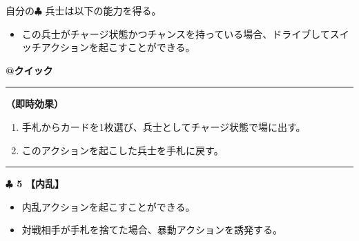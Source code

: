 \documentclass[twocolumn,a5paper,papersize,10pt]{jarticle}
\begin{document}
自分の{\normalsize $\clubsuit$} 兵士は以下の能力を得る。


\vspace{-1zh}%
\begin{itemize}
\setlength{\leftskip}{-0.3cm}
\setlength{\parskip}{0pt} %

\item この兵士がチャージ状態かつチャンスを持っている場合、ドライブしてスイッチアクションを起こすことができる。
\vspace{-1zh}%
\end{itemize}

\begin{tcolorbox}[title={\small\bf【Action】スイッチ}{\scriptsize （兵士起因）}]

{\scriptsize\bf @クイック }

\vspace{1mm} %
\hrule height 0.1mm depth 0mm width 62mm %
\vspace{1mm} %

{\bf（即時効果）}


\vspace{-1zh}%
\begin{enumerate}
\setlength{\leftskip}{-0.3cm}
\setlength{\parskip}{0pt} %

\item 手札からカードを1枚選び、兵士としてチャージ状態で場に出す。

\item このアクションを起こした兵士を手札に戻す。
\vspace{-1zh}%
\end{enumerate}

\vspace{1mm} %
\end{tcolorbox}

\vspace{-1zh}
  
 

\vspace{3mm} %
\hrule height 0.5mm depth 0mm width 66.5mm %
\vspace{1mm} %
{\Large\bf $\clubsuit$ 5} {\normalsize\bf【内乱】} %
\vspace{1mm} %


\vspace{-1zh}%
\begin{itemize}
\setlength{\leftskip}{-0.3cm}
\setlength{\parskip}{0pt} %

\item 内乱アクションを起こすことができる。

\item 対戦相手が手札を捨てた場合、暴動アクションを誘発する。
\vspace{-1zh}%
\end{itemize}
\end{document}
